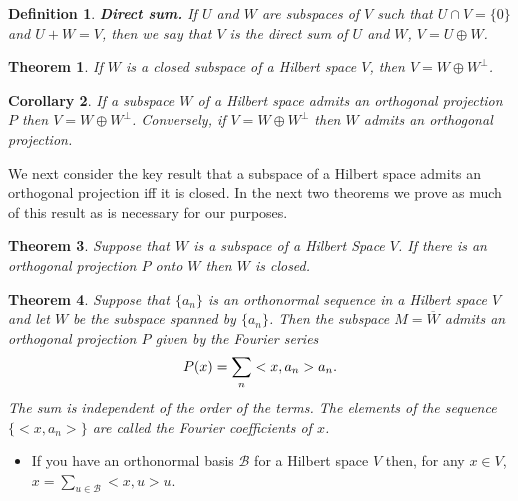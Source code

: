 \documentclass[two column]{article}
\newtheorem{theorem}{Theorem}[subsection]
\newtheorem{corollary}[theorem]{Corollary}
\newtheorem{definition}{Definition}[subsection]
\begin{document}
\begin{definition}
{\bf Direct sum.} If $U$ and $W$ are subspaces of $V$ such that $U \cap V = \{ 0 \}$ and $U + W = V$, then we say that $V$ is the direct sum of $U$ and $W$, $V = U \oplus W$. \\
\end{definition}

\begin{theorem}
If $W$ is a closed subspace of a Hilbert space $V$, then $V = W \oplus W^{\bot}$. \\
\end{theorem}

\begin{corollary}
If a subspace $W$ of a Hilbert space admits an orthogonal projection $P$ then $V = W \oplus W^{\bot}$. Conversely, if $V = W \oplus W^{\bot}$ then $W$ admits an orthogonal projection. \vspace{5pt}
\end{corollary}

We next consider the key result that a subspace of a Hilbert space admits an orthogonal projection iff it is closed. In the next two theorems we prove as much of this result as is necessary for our purposes. \\

\begin{theorem}
Suppose that $W$ is a subspace of a Hilbert Space $V$. If there is an orthogonal projection $P$ onto $W$ then $W$ is closed. \\
\end{theorem}

\begin{theorem}
Suppose that $\{ a_{n} \}$ is an orthonormal sequence in a Hilbert space $V$ and let $W$ be the subspace spanned by $\{ a_{n} \}$. Then the subspace $M = \overline{W}$ admits an orthogonal projection $P$ given by the Fourier series \vspace{-5pt}
\[
P(x) = \sum_{n} < x,a_{n} > a_{n}. \vspace{-5pt}
\]
The sum is independent of the order of the terms. The elements of the sequence $\{ < x,a_{n} > \}$ are called the \emph{Fourier coefficients} of $x$.
\end{theorem}
\begin{itemize}
\item If you have an orthonormal basis $\mathcal{B}$ for a Hilbert space $V$ then, for any $x \in V$, $x = \sum_{u \in \mathcal{B}} <x,u>u$. \\
\end{itemize}
\end{document}
